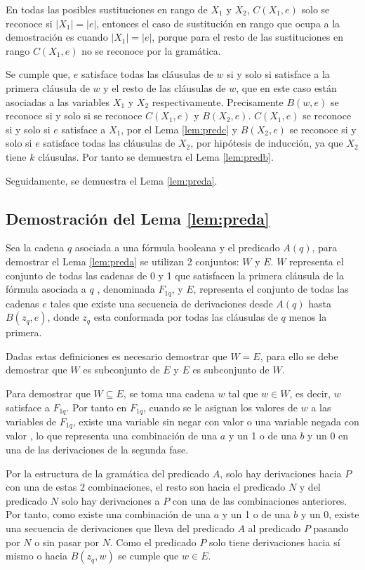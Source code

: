 En todas las posibles sustituciones en rango de $X_1$ y $X_2$, $C(X_1,e)$ solo se reconoce si $|X_1|=|e|$, 
entonces el caso de sustitución en rango que ocupa a la demostración es cuando $|X_1|=|e|$, porque para el 
resto de las sustituciones en rango $C(X_1,e)$ no se reconoce por la gramática.  

Se cumple que, $e$ satisface 
todas las cláusulas de $w$ si y solo si satisface a la primera cláusula de $w$ y el resto de las cláusulas de 
$w$, que en este caso están asociadas a las variables $X_1$ y $X_2$ respectivamente. 
Precisamente $B(w,e)$ se reconoce si y solo si se reconoce $C(X_1,e)$ y $B(X_2,e)$. 
$C(X_1,e)$ se reconoce si y solo si $e$ satisface a $X_1$, por el Lema \ref{lem:predc} y $B(X_2,e)$ se reconoce si 
y solo si $e$ satisface todas las cláusulas de $X_2$, por hipótesis de inducción, ya que $X_2$ tiene $k$
cláusulas. Por tanto se demuestra el Lema \ref{lem:predb}.

Seguidamente, se demuestra el Lema \ref{lem:preda}.

\subsection{Demostración del Lema \ref{lem:preda}}

Sea la cadena $q$ asociada a una fórmula booleana y el predicado $A(q)$, para demostrar el Lema \ref{lem:preda} se utilizan 2 conjuntos: $W$ y $E$. $W$ representa el conjunto de todas las cadenas de 0 y 1 que satisfacen la primera cláusula de la fórmula asociada a $q$ , denominada $F_{1q}$, y $E$, representa el conjunto de todas las cadenas $e$ tales que existe una secuencia de derivaciones desde $A(q)$ hasta $B(z_q,e)$, donde $z_q$ esta conformada por todas las cláusulas de $q$ menos la primera.

Dadas estas definiciones es necesario demostrar que $W=E$, para ello se debe demostrar que $W$ es subconjunto de $E$ y $E$ es subconjunto de $W$. 

Para demostrar que $W\subseteq E$, se toma una cadena $w$ tal que $w\in W$, es decir, $w$ satisface a $F_{1q}$. 
Por tanto en $F_{1q}$, cuando se le asignan los valores de $w$ a las variables de $F_{1q}$, existe una variable 
sin negar con valor \true{} o una variable negada con valor \false{}, lo que representa una combinación de una $a$ y un 1 o de una $b$ y un 0 en una de las derivaciones de la segunda fase.

Por la estructura de la gramática del predicado $A$, solo hay derivaciones hacia $P$ con una de estas 2 combinaciones, el resto son hacia el predicado $N$ y del predicado $N$ solo hay derivaciones a $P$ con una de las combinaciones anteriores. Por tanto, como existe una combinación de una $a$ y un 1 o de una $b$ y un 0, existe una secuencia de derivaciones que lleva del predicado $A$ al predicado $P$ pasando por $N$ o sin pasar por $N$. Como el predicado $P$ solo tiene derivaciones hacia sí mismo o hacia $B(z_q,w)$ se cumple que $w\in E$.

